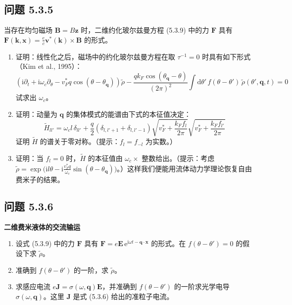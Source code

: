 \subsection*{问题 5.3.5}

当存在均匀磁场 $\pmb{B}=B\pmb{z}$ 时，二维约化玻尔兹曼方程 (5.3.9) 中的力 $\pmb{F}$ 具有 $\pmb{F}(\pmb{k},\pmb{x})=\frac{e}{c}\pmb{v}^{*}(\pmb{k})\times\pmb{B}$ 的形式。
\begin{enumerate}
\item[(a)] 证明：线性化之后，磁场中的约化玻尔兹曼方程在取 $\tau^{-1}=0$ 时具有如下形式（Kim et al., 1995）：
\begin{equation*}
\left(\mathrm{i}\partial_{t}+\mathrm{i}\omega_{c}\partial_{\theta}-v_{F}^{*}q\cos(\theta-\theta_{\pmb{q}})\right)\tilde{\rho}-\frac{qk_{F}\cos(\theta_{\pmb{q}}-\theta)}{(2\pi)^{2}}\int \mathrm{d}\theta'\,f(\theta-\theta')\,\tilde{\rho}(\theta',\pmb{q},t)=0
\end{equation*}
试求出 $\omega_{c}$。
\item[(b)] 证明：动量为 $\pmb{q}$ 的集体模式的能谱由下式的本征值决定：
\begin{equation*}
\tilde{H}_{ll'}=\omega_{c}l\,\delta_{ll'}+\frac{q}{2}\left(\delta_{l,l'+1}+\delta_{l,l'-1}\right)\sqrt{v_{F}^{*}+\frac{k_{F}f_{l}}{2\pi}}\sqrt{v_{F}^{*}+\frac{k_{F}f_{l'}}{2\pi}}
\end{equation*}
证明 $\tilde{H}$ 的谱关于零对称。（提示：$f_{l}=f_{-l}$ 为实数。）
\item[(c)] 证明：当 $f_{l}=0$ 时，$\tilde{H}$ 的本征值由 $\omega_{c}\times$ 整数给出。（提示：考虑 $\tilde{\rho}=\exp\bigl(\mathrm{i}l\theta-\mathrm{i}\frac{v_{F}^{*}q}{\omega_{c}}\sin(\theta-\theta_{\pmb{q}})\bigr)$。）这样我们便能用流体动力学理论恢复自由费米子的结果。
\end{enumerate}

\subsection*{问题 5.3.6}

\textbf{二维费米液体的交流输运}

\begin{enumerate}
\item[(a)] 设式 (5.3.9) 中的力 $\pmb{F}$ 具有 $\pmb{F}=e\pmb{E}\,\mathrm{e}^{\mathrm{i}\omega t-\pmb{q}\cdot\pmb{x}}$ 的形式。在 $f(\theta-\theta')=0$ 的假设下求 $\tilde{\rho}$。
\item[(b)] 准确到 $f(\theta-\theta')$ 的一阶，求 $\tilde{\rho}$。
\item[(c)] 求感应电流 $e\pmb{J}=\sigma(\omega,\pmb{q})\pmb{E}$，并准确到 $f(\theta-\theta')$ 的一阶求光学电导 $\sigma(\omega,\pmb{q})$。这里 $\pmb{J}$ 是式 (5.3.6) 给出的准粒子电流。
\end{enumerate}

